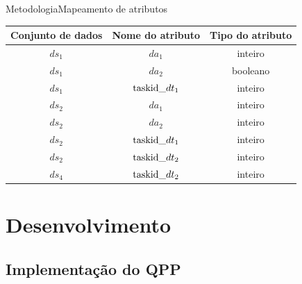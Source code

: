 \documentclass[12pt,compress]{beamer}
\begin{document}
{\begin{frame}[t]{Metodologia}{Mapeamento de atributos}
{\begin{table}[!htb]
    \small
    \centering
    \begin{tabular}{c|c|c}
    \textbf{Conjunto de dados} & \textbf{Nome do atributo} & \textbf{Tipo do atributo} \\ \hline
\rowcolor{red!10}
$ds_1$                        & $da_1$                        & inteiro                 \\
$ds_1$                        & $da_2$                        & booleano                \\
\rowcolor{blue!10}
$ds_1$                        & $\textup{taskid\_}dt_1$      & inteiro                 \\ \hline
\rowcolor{red!10}
$ds_2$                        & $da_1$                        & inteiro                 \\
$ds_2$                        & $da_2$                        & inteiro                 \\
\rowcolor{blue!10}
$ds_2$                        & $\textup{taskid\_}dt_1$      & inteiro                 \\
\rowcolor{green!10}
$ds_2$                        & $\textup{taskid\_}dt_2$      & inteiro                 \\ \hline
\rowcolor{green!10}
$ds_4$                        & $\textup{taskid\_}dt_2$      & inteiro                  
    \end{tabular}
\end{table}
}

\end{frame}
}


\section{Desenvolvimento}
\subsection*{Implementação do QPP}
\end{document}
